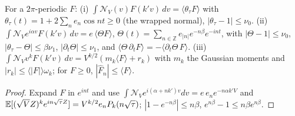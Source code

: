 \begin{lemma} \proofst
\label{lem:BL0}
For a $2\pi$-periodic $F$: (i) $\int\mathcal N_V(v)F(k'v)\,dv=\langle\theta_\tau F\rangle$ with $\theta_\tau(t)=1+2\sum_ne_n\cos nt\ge0$ (the wrapped normal),
$|\theta_\tau-1|\le\nu_0$. (ii) $\int\mathcal N_Ve^{i\alpha v}F(k'v)\,dv=e\,\langle\Theta F\rangle$, $\Theta(t)=\sum_{n\in\mathbb Z}e_{|n|}e^{-n\beta}e^{-int}$, with
$|\Theta-1|\le\nu_0$, $|\theta_\tau-\Theta|\le\beta\nu_1$, $|\partial_t\Theta|\le\nu_1$, and $\langle\Theta\,\partial_tF\rangle=-\langle\partial_t\Theta\,F\rangle$.
(iii) $\int\mathcal N_Vv^kF(k'v)\,dv=V^{k/2}(m_k\langle F\rangle+r_k)$ with $m_k$ the Gaussian moments and $|r_k|\le\langle|F|\rangle\omega_k$; for $F\ge0$,
$|\hat F_n|\le\langle F\rangle$.
\end{lemma}
\begin{proof}
Expand $F$ in $e^{int}$ and use $\int\mathcal N_Ve^{i(\alpha+nk')v}dv=e\,e_ne^{-n\alpha k'V}$ and $\mathbb{E}[(\sqrt VZ)^ke^{in\sqrt\tau Z}]=V^{k/2}e_nP_k(n\sqrt\tau)$;
$|1-e^{-n\beta}|\le n\beta$, $e^{n\beta}-1\le n\beta e^{n\beta}$.
\end{proof}

